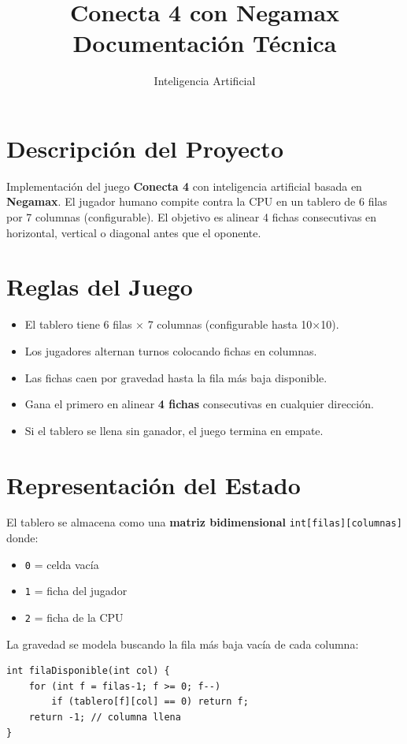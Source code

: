 \documentclass[12pt,a4paper]{article}
\title{\textbf{Conecta 4 con Negamax}\\
  \large Documentación Técnica}
\author{Inteligencia Artificial}
\date{}
\begin{document}
\maketitle
\tableofcontents
\newpage

\section{Descripción del Proyecto}
Implementación del juego \textbf{Conecta 4} con inteligencia artificial basada en \textbf{Negamax}. El jugador humano compite contra la CPU en un tablero de 6 filas por 7 columnas (configurable). El objetivo es alinear 4 fichas consecutivas en horizontal, vertical o diagonal antes que el oponente.

\section{Reglas del Juego}

\begin{itemize}
  \item El tablero tiene 6 filas × 7 columnas (configurable hasta 10×10).
  \item Los jugadores alternan turnos colocando fichas en columnas.
  \item Las fichas caen por gravedad hasta la fila más baja disponible.
  \item Gana el primero en alinear \textbf{4 fichas} consecutivas en cualquier dirección.
  \item Si el tablero se llena sin ganador, el juego termina en empate.
\end{itemize}

\section{Representación del Estado}

El tablero se almacena como una \textbf{matriz bidimensional} \texttt{int[filas][columnas]} donde:
\begin{itemize}
  \item \texttt{0} = celda vacía
  \item \texttt{1} = ficha del jugador
  \item \texttt{2} = ficha de la CPU
\end{itemize}

La gravedad se modela buscando la fila más baja vacía de cada columna:
\begin{lstlisting}
int filaDisponible(int col) {
    for (int f = filas-1; f >= 0; f--)
        if (tablero[f][col] == 0) return f;
    return -1; // columna llena
}
\end{lstlisting}
\end{document}
